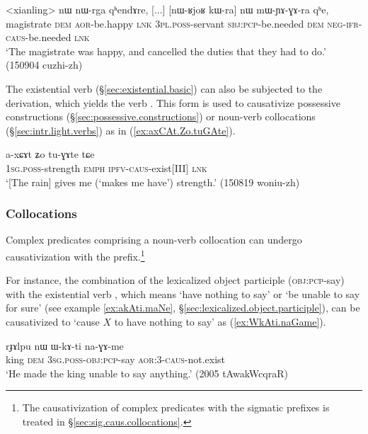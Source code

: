 \begin{exe}
\ex \label{ex:mWYAGAra}
\gll <xianling> nɯ nɯ-rga qʰendɤre, [...] [nɯ-ʁjoʁ kɯ-ra] nɯ mɯ-ɲɤ-ɣɤ-ra qʰe, \\
magistrate \textsc{dem} \textsc{aor}-be.happy \textsc{lnk} { } \textsc{3pl}.\textsc{poss}-servant \textsc{sbj}:\textsc{pcp}-be.needed \textsc{dem} \textsc{neg}-\textsc{ifr}-\textsc{caus}-be.needed \textsc{lnk} \\
\glt `The magistrate was happy, and cancelled the duties that they had to do.' (150904 cuzhi-zh)
\end{exe}
 
 The existential verb   (§\ref{sec:existential.basic}) can also be subjected to the  derivation, which yields the verb . This form is used to causativize possessive constructions (§\ref {sec:possessive.constructions}) or noun-verb collocations (§\ref{sec:intr.light.verbs}) as in (\ref{ex:axCAt.Zo.tuGAte}).
 
\begin{exe}
\ex \label{ex:axCAt.Zo.tuGAte}
\gll  a-xɕɤt ʑo tu-ɣɤte tɕe \\
\textsc{1sg}.\textsc{poss}-strength \textsc{emph} \textsc{ipfv}-\textsc{caus}-exist[III] \textsc{lnk} \\
\glt `[The rain] gives me (`makes me have') strength.' (150819 woniu-zh)
\end{exe}

\subsubsection{Collocations} \label{sec:velar.causative.collocation}
 
Complex predicates comprising a noun-verb collocation can undergo causativization with the  prefix.\footnote{The causativization of complex predicates with the sigmatic prefixes is treated in §\ref{sec:sig.caus.collocations}. }

For instance, the combination of the lexicalized object participle  (\textsc{obj}:\textsc{pcp}-say) with the existential verb , which means  `have nothing to say' or `be unable to say for sure' (see example \ref{ex:akAti.maNe}, §\ref{sec:lexicalized.object.participle}), can be causativized to  `cause $X$ to have nothing to say' as (\ref{ex:WkAti.naGame}).

\begin{exe}
\ex \label{ex:WkAti.naGame}
\gll rɟɤlpu nɯ ɯ-kɤ-ti na-ɣɤ-me \\
king \textsc{dem} \textsc{3sg}.\textsc{poss}-\textsc{obj}:\textsc{pcp}-say \textsc{aor}:3\flobv{}-\textsc{caus}-not.exist \\
\glt `He made the king unable to say anything.' (2005 tAwakWcqraR)
\end{exe}
 

